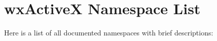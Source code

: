 \section{wx\-Active\-X Namespace List}
Here is a list of all documented namespaces with brief descriptions:\begin{CompactList}
\item{}
\end{CompactList}
